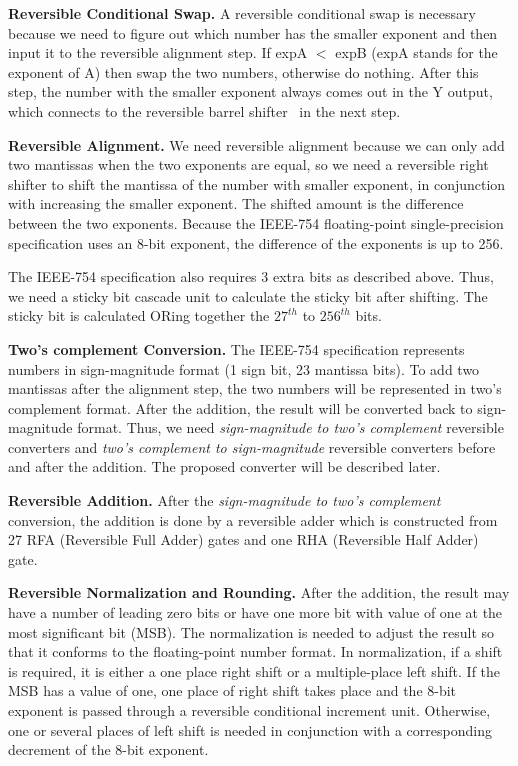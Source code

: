 \documentclass[%
reprint,
 amsmath,amssymb,
 aps,
]{revtex4-1}
\begin{document}
{\bf Reversible Conditional Swap.} A reversible conditional swap is necessary because we need to figure out which number has the smaller exponent and then input it to the reversible alignment step. If expA $<$ expB (expA stands for the exponent of A) then swap the two numbers, otherwise do nothing. After this step, the number with the smaller exponent always comes out in the Y output, which connects to the reversible barrel shifter~\cite{barrel-shifter} in the next step. 
 
\bigskip

{\bf Reversible Alignment.} We need reversible alignment because we can only add two mantissas when the two exponents are equal, so we need a reversible right shifter to shift the mantissa of the number with smaller exponent, in conjunction with increasing the smaller exponent. The shifted amount is the difference between the two exponents. Because the IEEE-754 floating-point single-precision specification uses an 8-bit exponent, the difference of the exponents is up to 256. 
\par The IEEE-754 specification also requires 3 extra bits as described above. Thus, we need a sticky bit cascade unit to calculate the sticky bit after shifting. The sticky bit is calculated ORing together the $27^{th}$ to $256^{th}$ bits. 

\bigskip

{\bf Two's complement Conversion.} The IEEE-754 specification represents numbers in sign-magnitude format (1 sign bit, 23 mantissa bits). To add two mantissas after the alignment step, the two numbers will be represented in two's complement format. After the addition, the result will be converted back to sign-magnitude format. Thus, we need \emph{sign-magnitude to two's complement} reversible converters and \emph{two's complement to sign-magnitude} reversible converters before and after the addition. The proposed converter will be described later.

\bigskip

{\bf Reversible Addition.} After the \emph{sign-magnitude to two's complement} conversion, the addition is done by a reversible adder which is constructed from 27 RFA (Reversible Full Adder) gates and one RHA (Reversible Half Adder) gate.

\bigskip

{\bf Reversible Normalization and Rounding.} After the addition, the result may have a number of leading zero bits or have one more bit with value of one at the most significant bit (MSB). The normalization is needed to adjust the result so that it conforms to the floating-point number format. In normalization, if a shift is required, it is either a one place right shift or a multiple-place left shift. If the MSB has a value of one, one place of right shift takes place and the 8-bit exponent is passed through a reversible conditional increment unit. Otherwise, one or several places of left shift is needed in conjunction with a corresponding decrement of the 8-bit exponent. 
\end{document}
